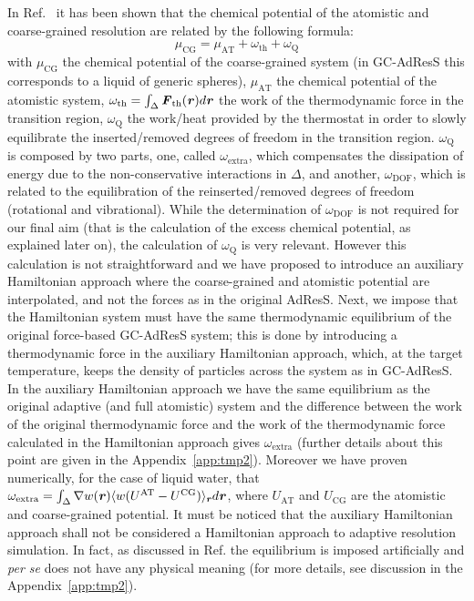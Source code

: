 \documentclass[a4paper,preprint,unsortedaddress]{revtex4-1}
\newcommand{\vect}[1]{\textbf{\textit{#1}}}
\newcommand{\dof}{{\textrm{DOF}}}
\newcommand{\AT}{{\textrm{{AT}}}}
\newcommand{\CG}{{\textrm{CG}}}
\newcommand{\thf}{{\textrm{th}}}
\newcommand{\ext}{{\textrm{extra}}}
\newcommand{\thermo}{{\textrm{Q}}}
\begin{document}
In Ref.~\cite{prx} it has been shown that the chemical potential of the atomistic and coarse-grained resolution are related by the following formula: 
\begin{equation}
\mu_{\CG}=\mu_{\AT}+\omega_{\thf}+\omega_{\thermo}
\label{mu}
\end{equation}
with $\mu_{\CG}$ the chemical potential of the coarse-grained system (in GC-AdResS this corresponds to a liquid of generic spheres), $\mu_{\AT}$  the chemical potential of the atomistic system, $\omega_{\thf}=\int_{\Delta}{\vect F}_{\thf}({\vect r})d{\vect r}$ the work of the thermodynamic force in the transition region, $\omega_{\thermo}$ the work/heat provided by the thermostat in order to slowly equilibrate the inserted/removed degrees of freedom in the transition region. $\omega_{\thermo}$ is composed by two parts, one, called $\omega_{\ext}$, which compensates the dissipation of energy due to the non-conservative interactions in $\Delta$, and another, $\omega_{\dof}$, which is related to the equilibration of the reinserted/removed degrees of freedom (rotational and vibrational). {While the determination of $\omega_{\dof}$ is not required for our final aim (that is the calculation of the excess chemical potential, as explained later on), the calculation of $\omega_{\thermo}$ is very relevant}. However this calculation is not straightforward and we have proposed to introduce an auxiliary Hamiltonian approach where the coarse-grained and atomistic potential are interpolated, and not the forces as in {the original} AdResS. Next, we impose that the Hamiltonian system must have the same thermodynamic equilibrium of the original force-based GC-AdResS system; this is done by introducing a thermodynamic force in the auxiliary Hamiltonian approach, which, at the target temperature, keeps the density of particles across the system as in GC-AdResS. {In the auxiliary Hamiltonian approach we have the same equilibrium as the original adaptive (and full atomistic) system  and the difference between the work of the original thermodynamic force and the work of the thermodynamic force calculated in the Hamiltonian approach gives $\omega_{\ext}$ (further details about this point are given in the {Appendix~\ref{app:tmp2}})}. Moreover we have proven numerically, for the case of liquid water, that
  $\omega_{\ext}=\int_{\Delta}\nabla w(\vect r)\langle w( U^{\AT}-U^{\CG})\rangle_{\vect r} d{\vect r}$,
  where $U_{\AT}$ and $U_{\CG}$ are the atomistic and coarse-grained potential.
{It must be noticed that the auxiliary Hamiltonian approach shall not be considered a Hamiltonian approach to adaptive resolution simulation. In fact, as discussed in Ref.\cite{prx} the equilibrium is imposed artificially and {\it per se} does not have any physical meaning (for more details, see discussion in the {Appendix~\ref{app:tmp2}})}. 
\end{document}
